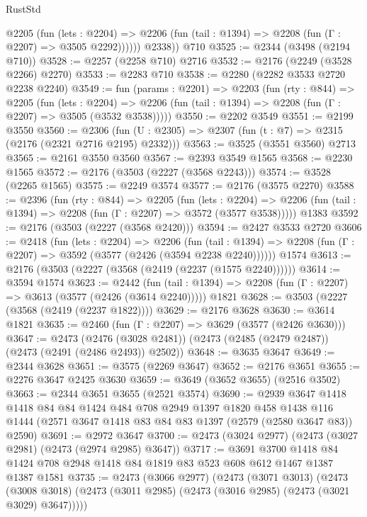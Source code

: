 \begin{lexlean}{RustStd}
\begin{coremodule}
{\begin{coremodule}
{{{{{{{{{{            @2205
              (fun (lets : @2204) =>
              @2206 (fun (tail : @1394) => @2208 (fun (Γ : @2207) => @3505 @2292))))))
        @2338))
    @710
@3525 := @2344 (@3498 (@2194 @710))
@3528 := @2257 (@2258 @710) @2716
@3532 := @2176 (@2249 (@3528 @2266) @2270)
@3533 := @2283 @710
@3538 := @2280 (@2282 @3533 @2720 @2238 @2240)
@3549 := fun (params : @2201) =>
  @2203
    (fun (rty : @844) =>
    @2205
      (fun (lets : @2204) =>
      @2206 (fun (tail : @1394) => @2208 (fun (Γ : @2207) => @3505 (@3532 @3538)))))
@3550 := @2202 @3549
@3551 := @2199 @3550
@3560 := @2306 (fun (U : @2305) => @2307 (fun (t : @7) => @2315 (@2176 (@2321 @2716 @2195) @2332)))
@3563 := @3525 (@3551 @3560) @2713
@3565 := @2161 @3550 @3560
@3567 := @2393 @3549 @1565
@3568 := @2230 @1565
@3572 := @2176 (@3503 (@2227 (@3568 @2243)))
@3574 := @3528 (@2265 @1565)
@3575 := @2249 @3574
@3577 := @2176 (@3575 @2270)
@3588 := @2396
    (fun (rty : @844) =>
    @2205
      (fun (lets : @2204) =>
      @2206 (fun (tail : @1394) => @2208 (fun (Γ : @2207) => @3572 (@3577 @3538)))))
    @1383
@3592 := @2176 (@3503 (@2227 (@3568 @2420)))
@3594 := @2427 @3533 @2720
@3606 := @2418
    (fun (lets : @2204) =>
    @2206
      (fun (tail : @1394) => @2208 (fun (Γ : @2207) => @3592 (@3577 (@2426 (@3594 @2238 @2240))))))
    @1574
@3613 := @2176 (@3503 (@2227 (@3568 (@2419 (@2237 (@1575 @2240))))))
@3614 := @3594 @1574
@3623 := @2442
    (fun (tail : @1394) => @2208 (fun (Γ : @2207) => @3613 (@3577 (@2426 (@3614 @2240)))))
    @1821
@3628 := @3503 (@2227 (@3568 (@2419 (@2237 @1822))))
@3629 := @2176 @3628
@3630 := @3614 @1821
@3635 := @2460 (fun (Γ : @2207) => @3629 (@3577 (@2426 @3630)))
@3647 := @2473
    (@2476 (@3028 @2481))
    (@2473 (@2485 (@2479 @2487)) (@2473 (@2491 (@2486 @2493)) @2502))
@3648 := @3635 @3647
@3649 := @2344 @3628
@3651 := @3575 (@2269 @3647)
@3652 := @2176 @3651
@3655 := @2276 @3647 @2425 @3630
@3659 := @3649 (@3652 @3655) (@2516 @3502)
@3663 := @2344 @3651 @3655 (@2521 @3574)
@3690 := @2939
    @3647
    @1418
    @1418
    @84
    @84
    @1424
    @484
    @708
    @2949
    @1397
    @1820
    @458
    @1438
    @116
    @1444
    (@2571 @3647 @1418 @83 @84 @83 @1397 (@2579 (@2580 @3647 @83)) @2590)
@3691 := @2972 @3647
@3700 := @2473 (@3024 @2977) (@2473 (@3027 @2981) (@2473 (@2974 @2985) @3647))
@3717 := @3691
    @3700
    @1418
    @84
    @1424
    @708
    @2948
    @1418
    @84
    @1819
    @83
    @523
    @608
    @612
    @1467
    @1387
    @1387
    @1581
@3735 := @2473
    (@3066 @2977)
    (@2473
      (@3071 @3013)
      (@2473 (@3008 @3018) (@2473 (@3011 @2985) (@2473 (@3016 @2985) (@2473 (@3021 @3029) @3647)))))
}}}}}}}}}}
\end{coremodule}}
\end{coremodule}
\end{lexlean}
